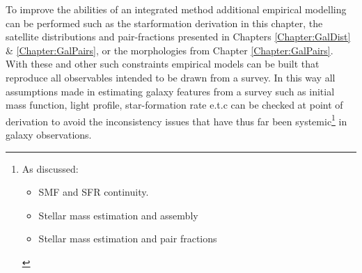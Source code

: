 To improve the abilities of an integrated method additional empirical modelling can be performed such as the starformation derivation in this chapter, the satellite distributions and pair-fractions presented in Chapters \ref{Chapter:GalDist} \& \ref{Chapter:GalPairs}, or the morphologies from Chapter \ref{Chapter:GalPairs}. With these and other such constraints empirical models can be built that reproduce all observables intended to be drawn from a survey. In this way all assumptions made in estimating galaxy features from a survey such as initial mass function, light profile, star-formation rate e.t.c can be checked at point of derivation to avoid the inconsistency issues that have thus far been systemic\footnote{As discussed: \begin{itemize}
    \item SMF and SFR continuity.
    \item Stellar mass estimation and \LCDM assembly
    \item Stellar mass estimation and pair fractions
\end{itemize}} in galaxy observations. 
